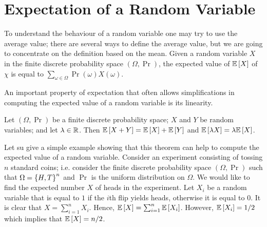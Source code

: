 \chapter{Expectation of a Random Variable}
To understand the behaviour of a random variable one may try to use the average
value; there are several ways to define the average value, but we are going to
concentrate on the definition based on the mean. Given a random variable $X$
in the finite discrete probability space $(\Omega, \Pr)$, the expected value of
$\mathbb{E}\left[X\right]$ of $\chi$ is equal to $\sum_{\omega \in \Omega}
\Pr(\omega) X(\omega)$.

An important property of expectation that often allows simplifications in
computing the expected value of a random variable is its linearity.
\begin{theorem}
  Let $(\Omega, \Pr)$ be a finite discrete probability space; $X$ and
  $Y$ be random variables; and let $\lambda \in {\mathbb{R}}$.
  Then $\mathbb{E}\left[X + Y\right] = \mathbb{E}\left[X\right] + \mathbb{E}\left[Y\right]$ and
  $\mathbb{E}\left[\lambda X\right] = \lambda \mathbb{E}\left[X\right]$.
\end{theorem}
Let su give a simple example showing that this theorem can help to compute the
expected value of a random variable. Consider an experiment consisting of
tossing $n$ standard coins; i.e. consider the finite discrete probability space
$(\Omega, \Pr)$ such that $\Omega = \set{H, T}^n$ and $\Pr$ is the uniform
distribution on $\Omega$. We would like to find the expected number $X$ of heads
in the experiment. Let $X_i$ be a random variable that is equal to $1$ if the
$i$th flip yields heads, otherwise it is equal to $0$. It is clear that $X =
\sum_{i = 1}^n X_i$. Hence, $\mathbb{E}\left[X\right] = \sum_{i = 1}^n \mathbb{E}\left[X_i\right]$.
However, $\mathbb{E}\left[X_i\right] = 1 / 2$ which implies that $\mathbb{E}\left[X\right] = n / 2$.
